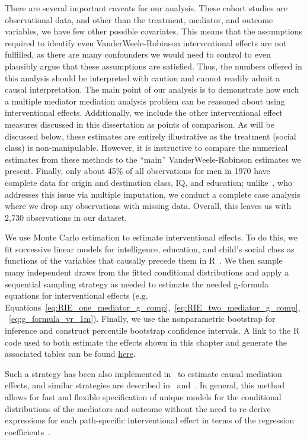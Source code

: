 There are several important caveats for our analysis. These cohort studies are observational data, 
and other than the treatment, mediator, and outcome variables, we have few other possible covariates. 
This means that the assumptions required to identify even VanderWeele-Robinson interventional effects 
are not fulfilled, as there are many confounders we would need to control to even plausibly argue
that these assumptions are satisfied. Thus, the numbers offered in this analysis should be 
interpreted with caution and cannot readily admit a causal interpretation. The main point of our 
analysis is to demonstrate how such a multiple mediator mediation analysis problem can be reasoned 
about using interventional effects. Additionally, we include the other interventional effect measures
discussed in this dissertation as points of comparison. As will be discussed below, these estimates 
are entirely illustrative as the treatment (social class) is non-manipulable. However, it is instructive 
to compare the numerical estimates from these methods to the ``main'' VanderWeele-Robinson estimates 
we present. Finally, only about 45\% of all observations for men in 1970 have complete data for 
origin and destination class, IQ, and education; unlike~\cite{kuhaetal2021}, who addresses this issue
via multiple imputation, we conduct a complete case analysis where we drop any observations with missing 
data. Overall, this leaves us with 2,730 observations in our dataset. 

We use Monte Carlo estimation to estimate interventional effects. To do this, we fit successive linear models
for intelligence, education, and child's social class as functions of the variables that causally
precede them in R~\citep{areletal2024}. We then sample many independent draws from the fitted conditional 
distributions and apply
a sequential sampling strategy as needed to estimate the needed g-formula equations for interventional effects
(e.g. Equations~\ref{eq:RIE_one_mediator_g_comp},~\ref{eq:RIE_two_mediator_g_comp},~\ref{eq:g_formula_vr_1m}). 
Finally, we use the nonparametric bootstrap for inference and construct percentile bootstrap 
confidence intervals. A link to the R code used to both estimate the effects shown in this chapter and generate
the associated tables can be found
\href{https://github.com/hannhat/personal/tree/main/research/MSc_Thesis-Mediation_Analysis/code/analysis}{here}. 

Such a strategy has been also implemented 
in~\cite{imaietal2010a} to estimate causal mediation effects, and similar strategies are described 
in~\cite{vansteelandtdaniel2017} and~\cite{kuhaetal2021}. In general, this method allows for fast and 
flexible specification of unique models for the conditional distributions of the mediators and outcome 
without the need to re-derive expressions for each path-specific interventional effect in terms of the 
regression coefficients~\citep{vansteelandtdaniel2017}. 

